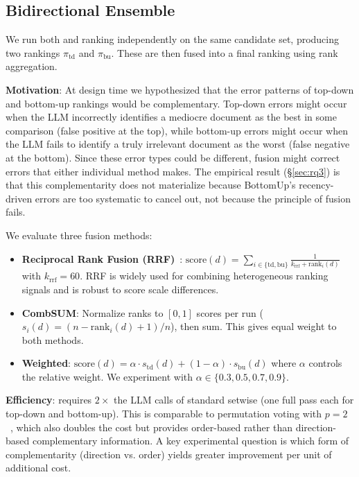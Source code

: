\subsection{Bidirectional Ensemble}
\label{sec:bidir}

We run both \topdown{} and \bottomup{} ranking independently on the same candidate set, producing two rankings $\pi_{\text{td}}$ and $\pi_{\text{bu}}$. These are then fused into a final ranking using rank aggregation.

\textbf{Motivation}: At design time we hypothesized that the error patterns of top-down and bottom-up rankings would be complementary. Top-down errors might occur when the LLM incorrectly identifies a mediocre document as the best in some comparison (false positive at the top), while bottom-up errors might occur when the LLM fails to identify a truly irrelevant document as the worst (false negative at the bottom). Since these error types could be different, fusion might correct errors that either individual method makes. The empirical result (\S\ref{sec:rq3}) is that this complementarity does not materialize because BottomUp's recency-driven errors are too systematic to cancel out, not because the principle of fusion fails.

We evaluate three fusion methods:
\begin{itemize}[leftmargin=*]
\item \textbf{Reciprocal Rank Fusion (RRF)}~\citep{cormack2009reciprocal}: $\text{score}(d) = \sum_{i \in \{\text{td}, \text{bu}\}} \frac{1}{k_\text{rrf} + \text{rank}_i(d)}$ with $k_\text{rrf}=60$. RRF is widely used for combining heterogeneous ranking signals and is robust to score scale differences.
\item \textbf{CombSUM}: Normalize ranks to $[0,1]$ scores per run ($s_i(d) = (n - \text{rank}_i(d) + 1) / n$), then sum. This gives equal weight to both methods.
\item \textbf{Weighted}: $\text{score}(d) = \alpha \cdot s_{\text{td}}(d) + (1-\alpha) \cdot s_{\text{bu}}(d)$ where $\alpha$ controls the relative weight. We experiment with $\alpha \in \{0.3, 0.5, 0.7, 0.9\}$.
\end{itemize}

\textbf{Efficiency}: \bidir{} requires $2\times$ the LLM calls of standard setwise (one full pass each for top-down and bottom-up). This is comparable to permutation voting with $p=2$~\citep{zhuang2024setwise}, which also doubles the cost but provides order-based rather than direction-based complementary information. A key experimental question is which form of complementarity (direction vs. order) yields greater improvement per unit of additional cost.
